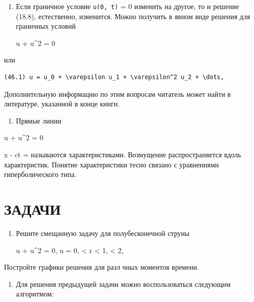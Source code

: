 \documentclass[
  ukrainian,
]{article}
\providecommand{\tightlist}{%
  \setlength{\itemsep}{0pt}\setlength{\parskip}{0pt}}
\begin{document}
\begin{enumerate}
\def\labelenumi{\arabic{enumi}.}
\setcounter{enumi}{1}
\item
  Если граничное условие \texttt{u(0,\ t)} = 0 изменить на другое, то и
  решение (18.8), естественно, изменится. Можно получить в явном виде
  решения для граничных условий

  \Delta u + \varepsilon u\^{}2 = 0
\end{enumerate}

или

\begin{verbatim}
(46.1) u = u_0 + \varepsilon u_1 + \varepsilon^2 u_2 + \dots,
\end{verbatim}

Дополнительную информацию по этим вопросам читатель может найти в
литературе, указанной в конце книги.

\begin{enumerate}
\def\labelenumi{\arabic{enumi}.}
\setcounter{enumi}{2}
\tightlist
\item
  Прямые линии
\end{enumerate}

 u + u\^{}2 = 0

x - ct =  называются характеристиками. Возмущение
распространяется вдоль характеристик. Понятие характеристики тесно
связано с уравнениями гиперболического типа.

\section{ЗАДАЧИ}\label{ux437ux430ux434ux430ux447ux438}

\begin{enumerate}
\def\labelenumi{\arabic{enumi}.}
\item
  Решите смещанную задачу для полубесконечной струны

  \Delta u + u\^{}2 = 0, \Delta u = 0,  \textless{} r \textless{}
  1,  \le \theta \textless{} 2\pi,
\end{enumerate}

Постройте графики решения для разл чных моментов времени.

\begin{enumerate}
\def\labelenumi{\arabic{enumi}.}
\setcounter{enumi}{1}
\tightlist
\item
  Для решения предыдущей задачи можно воспользоваться следующим
  алгоритмом:
\end{enumerate}
\end{document}
